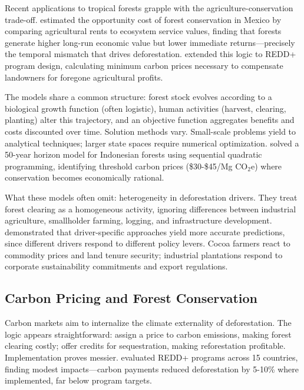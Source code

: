 Recent applications to tropical forests grapple with the agriculture-conservation trade-off. \citet{barbier2004valuing} estimated the opportunity cost of forest conservation in Mexico by comparing agricultural rents to ecosystem service values, finding that forests generate higher long-run economic value but lower immediate returns—precisely the temporal mismatch that drives deforestation. \citet{busch2012structuring} extended this logic to REDD+ program design, calculating minimum carbon prices necessary to compensate landowners for foregone agricultural profits.

The models share a common structure: forest stock evolves according to a biological growth function (often logistic), human activities (harvest, clearing, planting) alter this trajectory, and an objective function aggregates benefits and costs discounted over time. Solution methods vary. Small-scale problems yield to analytical techniques; larger state spaces require numerical optimization. \citet{mcdonald2019forest} solved a 50-year horizon model for Indonesian forests using sequential quadratic programming, identifying threshold carbon prices (\$30-\$45/Mg CO$_2$e) where conservation becomes economically rational.

What these models often omit: heterogeneity in deforestation drivers. They treat forest clearing as a homogeneous activity, ignoring differences between industrial agriculture, smallholder farming, logging, and infrastructure development. \citet{curtis2018classifying} demonstrated that driver-specific approaches yield more accurate predictions, since different drivers respond to different policy levers. Cocoa farmers react to commodity prices and land tenure security; industrial plantations respond to corporate sustainability commitments and export regulations.

\subsection{Carbon Pricing and Forest Conservation}

Carbon markets aim to internalize the climate externality of deforestation. The logic appears straightforward: assign a price to carbon emissions, making forest clearing costly; offer credits for sequestration, making reforestation profitable. Implementation proves messier. \citet{angelsen2017mechanisms} evaluated REDD+ programs across 15 countries, finding modest impacts—carbon payments reduced deforestation by 5-10\% where implemented, far below program targets.

